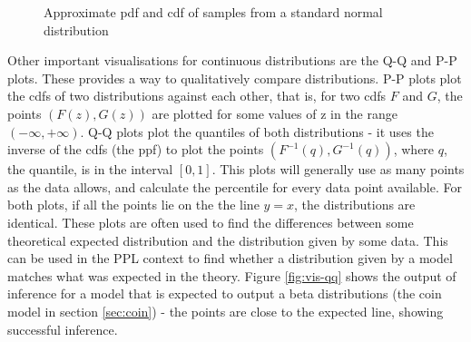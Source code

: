 \begin{figure}[!htb]
	\centering
	\qquad
	\caption{Approximate pdf and cdf of samples from a standard normal distribution}
	\label{fig:vis-norm}
\end{figure}
	
Other important visualisations for continuous distributions are the Q-Q and P-P plots. These provides a way to qualitatively compare distributions. P-P plots plot the cdfs of two distributions against each other, that is, for two cdfs $F$ and $G$, the points $(F(z), G(z))$ are plotted for some values of z in the range $(-\infty,+\infty)$. Q-Q plots plot the quantiles of both distributions - it uses the inverse of the cdfs (the ppf) to plot the points $(F^{-1}(q), G^{-1}(q))$, where $q$, the quantile, is in the interval $[0,1]$. This plots will generally use as many points as the data allows, and calculate the percentile for every data point available. For both plots, if all the points lie on the the line $y=x$, the distributions are identical. These plots are often used to find the differences between some theoretical expected distribution and the distribution given by some data. This can be used in the PPL context to find whether a distribution given by a model matches what was expected in the theory. Figure \ref{fig:vis-qq} shows the output of inference for a model that is expected to output a beta distributions (the coin model in section \ref{sec:coin}) - the points are close to the expected line, showing successful inference.

